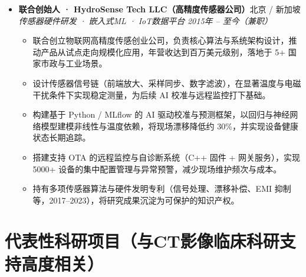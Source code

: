 \documentclass[letterpaper,10pt]{article}
\begin{document}
\begin{itemize}[leftmargin=0in, label={}]
  \item
  \textbf{联合创始人 · HydroSense Tech LLC（高精度传感器公司）}\hfill 北京 / 新加坡 \\
  \textit{传感器硬件研发 · 嵌入式ML · IoT数据平台} \hfill \textit{2015年 -- 至今（兼职）}
  \begin{itemize}[leftmargin=0.2in, topsep=1pt]
    \item 联合创立物联网高精度传感创业公司，负责核心算法与系统架构设计，推动产品从试点走向规模化应用，年营收达到百万美元级别，落地于 5+ 国家市政与工业场景。
    \item 设计传感器信号链（前端放大、采样同步、数字滤波），在显著温度与电磁干扰条件下实现稳定测量，为后续 AI 校准与远程监控打下基础。
    \item 构建基于 Python / MLflow 的 AI 驱动校准与预测框架，以回归与神经网络模型建模非线性与温度依赖，将现场漂移降低约 30\%，并实现设备健康状态长期追踪。
    \item 搭建支持 OTA 的远程监控与自诊断系统（C++ 固件 + 网关服务），实现 5000+ 设备的集中配置管理与异常预警，减少现场维护频次与成本。
    \item 持有多项传感器算法与硬件发明专利（信号处理、漂移补偿、EMI 抑制等，2017--2023），将研究成果沉淀为可保护的知识产权。
  \end{itemize}

\end{itemize}

\vspace{-2pt}

\section{代表性科研项目（与CT影像临床科研支持高度相关）}
\end{document}
